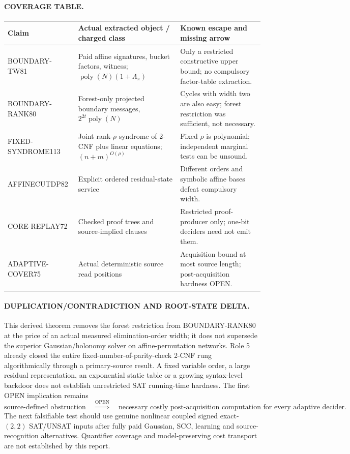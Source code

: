 \documentclass[11pt]{article}
\begin{document}
\paragraph{COVERAGE TABLE.}
\begin{center}\small
\begin{tabular}{p{.23\linewidth}p{.30\linewidth}p{.34\linewidth}}\toprule
Claim & Actual extracted object / charged class & Known escape and missing arrow\\\midrule
BOUNDARY-TW81 & Paid affine signatures, bucket factors, witness; $\operatorname{poly}(N)(1+\Lambda_\pi)$ & Only a restricted constructive upper bound; no compulsory factor-table extraction.\\
BOUNDARY-RANK80 & Forest-only projected boundary messages, $2^{2t}\operatorname{poly}(N)$ & Cycles with width two are also easy; forest restriction was sufficient, not necessary.\\
FIXED-SYNDROME113 & Joint rank-$\rho$ syndrome of 2-CNF plus linear equations; $(n+m)^{O(\rho)}$ & Fixed $\rho$ is polynomial; independent marginal tests can be unsound.\\
AFFINECUTDP82 & Explicit ordered residual-state service & Different orders and symbolic affine bases defeat compulsory width.\\
CORE-REPLAY72 & Checked proof trees and source-implied clauses & Restricted proof-producer only; one-bit deciders need not emit them.\\
ADAPTIVE-COVER75 & Actual deterministic source read positions & Acquisition bound at most source length; post-acquisition hardness OPEN.\\\bottomrule
\end{tabular}\end{center}

\paragraph{DUPLICATION/CONTRADICTION AND ROOT-STATE DELTA.}
This derived theorem removes the forest restriction from BOUNDARY-RANK80 at the price of an actual measured elimination-order width; it does not supersede the superior Gaussian/holonomy solver on affine-permutation networks. Role 5 already closed the entire fixed-number-of-parity-check 2-CNF rung algorithmically through a primary-source result. A fixed variable order, a large residual representation, an exponential static table or a growing syntax-level backdoor does not establish unrestricted SAT running-time hardness. The first OPEN implication remains
\[
\text{source-defined obstruction}\quad
\overset{\mathrm{OPEN}}{\Longrightarrow}\quad
\text{necessary costly post-acquisition computation for every adaptive decider}.
\]
The next falsifiable test should use genuine nonlinear coupled signed exact-$(2,2)$ SAT/UNSAT inputs after fully paid Gaussian, SCC, learning and source-recognition alternatives. Quantifier coverage and model-preserving cost transport are not established by this report.
\end{document}
